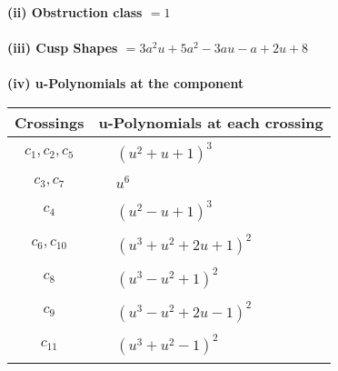 \documentclass[1p]{elsarticle_modified}
\theoremstyle{definition}
\begin{document}
\flushleft \textbf{(ii) Obstruction class $= 1$}\\~\\
\flushleft \textbf{(iii) Cusp Shapes $= 3 a^2 u+5 a^2-3 a u- a+2 u+8$}\\~\\
\newpage\renewcommand{\arraystretch}{1}
\flushleft \textbf{(iv) u-Polynomials at the component}\newline \\
\begin{tabular}{m{50pt}|m{274pt}}
Crossings & \hspace{64pt}u-Polynomials at each crossing \\
\hline $$\begin{aligned}c_{1},c_{2},c_{5}\end{aligned}$$&$\begin{aligned}
&(u^2+u+1)^3
\end{aligned}$\\
\hline $$\begin{aligned}c_{3},c_{7}\end{aligned}$$&$\begin{aligned}
&u^6
\end{aligned}$\\
\hline $$\begin{aligned}c_{4}\end{aligned}$$&$\begin{aligned}
&(u^2- u+1)^3
\end{aligned}$\\
\hline $$\begin{aligned}c_{6},c_{10}\end{aligned}$$&$\begin{aligned}
&(u^3+u^2+2 u+1)^2
\end{aligned}$\\
\hline $$\begin{aligned}c_{8}\end{aligned}$$&$\begin{aligned}
&(u^3- u^2+1)^2
\end{aligned}$\\
\hline $$\begin{aligned}c_{9}\end{aligned}$$&$\begin{aligned}
&(u^3- u^2+2 u-1)^2
\end{aligned}$\\
\hline $$\begin{aligned}c_{11}\end{aligned}$$&$\begin{aligned}
&(u^3+u^2-1)^2
\end{aligned}$\\
\hline
\end{tabular}\\~\\
\end{document}
